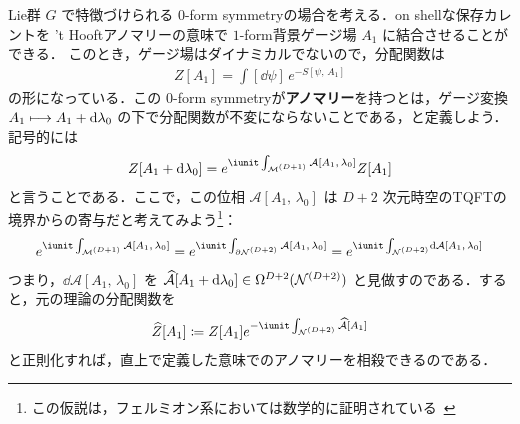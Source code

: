\documentclass[TQFT_main]{subfiles}
\begin{document}


Lie群 $G$ で特徴づけられる $0$-form symmetryの場合を考える．on shellな保存カレントを 't Hooftアノマリーの意味で $1$-form背景ゲージ場 $A_1$ に結合させることができる．
このとき，ゲージ場はダイナミカルでないので，分配関数は
\begin{align}
    Z[A_1] = \int [\dd{\psi}]\, e^{-S[\psi,\, A_1]}
\end{align}
の形になっている．この $0$-form symmetryが\textbf{アノマリー}を持つとは，ゲージ変換 $A_1 \longmapsto A_1 + \dd{\lambda_0}$ の下で分配関数が不変にならないことである，と定義しよう．記号的には
\begin{align}
    Z[A_1 + \dd{\lambda_0}] = e^{\iunit \int_{\mfdcal{M}{D+1}} \mathcal{A}[A_1,\, \lambda_0]} Z[A_1]
\end{align}
と言うことである．ここで，この位相 $\mathcal{A}[A_1,\, \lambda_0]$ は $D+2$ 次元時空のTQFTの境界からの寄与だと考えてみよう\footnote{この仮説は，フェルミオン系においては数学的に証明されている~\cite{DaiFreed_1994}}：
\begin{align}
    e^{\iunit \int_{\mfdcal{M}{D+1}} \mathcal{A}[A_1,\, \lambda_0]} = e^{\iunit \int_{\partial\mfdcal{N}{D+2}} \mathcal{A}[A_1,\, \lambda_0]} = e^{\iunit \int_{\mfdcal{N}{D+2}} \dd{\mathcal{A}[A_1,\, \lambda_0]}} 
\end{align}
つまり，$\dd{\mathcal{A}[A_1,\, \lambda_0]}$ を $\widehat{\mathcal{A}}[A_1 + \dd{\lambda_0}] \in \Omega^{D+2}(\mathcal{N}^{(D+2)})$ と見做すのである．すると，元の理論の分配関数を
\begin{align}
    \widehat{Z}[A_1] \coloneqq Z[A_1] e^{-\iunit \int_{\mfdcal{N}{D+2}} \widehat{\mathcal{A}}[A_1]}
\end{align}
と正則化すれば，直上で定義した意味でのアノマリーを相殺できるのである．
\end{document}
